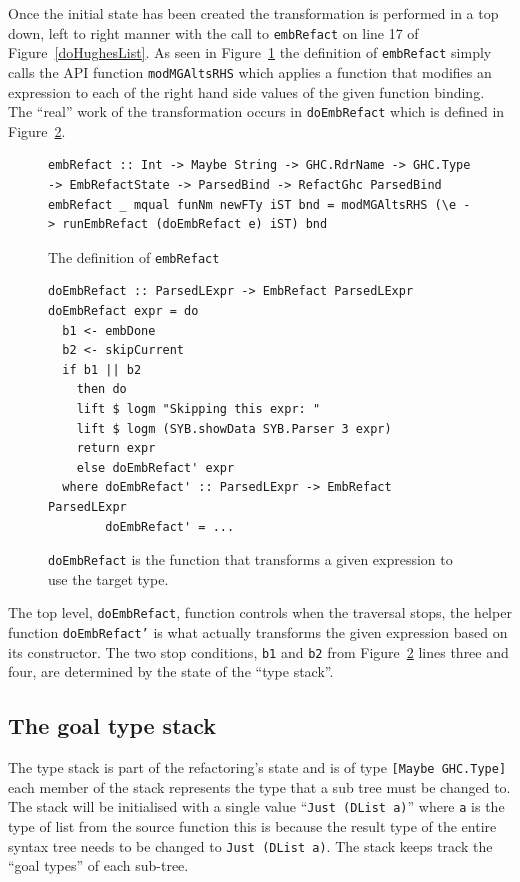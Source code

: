 Once the initial state has been created the transformation is performed in a top down, left to right manner with the call to \texttt{embRefact} on line 17 of Figure~\ref{doHughesList}. As seen in Figure~\ref{embRefact} the definition of \texttt{embRefact} simply calls the API function \texttt{modMGAltsRHS} which applies a function that modifies an expression to each of the right hand side values of the given function binding. The ``real'' work of the transformation occurs in \texttt{doEmbRefact} which is defined in Figure~\ref{doEmbRefact}.

\begin{figure}[t]
\begin{lstlisting}
embRefact :: Int -> Maybe String -> GHC.RdrName -> GHC.Type -> EmbRefactState -> ParsedBind -> RefactGhc ParsedBind
embRefact _ mqual funNm newFTy iST bnd = modMGAltsRHS (\e -> runEmbRefact (doEmbRefact e) iST) bnd
\end{lstlisting}
\caption{The definition of \texttt{embRefact}}
\label{embRefact}
\end{figure}

\begin{figure}[t]
\begin{lstlisting}
doEmbRefact :: ParsedLExpr -> EmbRefact ParsedLExpr
doEmbRefact expr = do
  b1 <- embDone
  b2 <- skipCurrent
  if b1 || b2
    then do
    lift $ logm "Skipping this expr: "
    lift $ logm (SYB.showData SYB.Parser 3 expr)
    return expr
    else doEmbRefact' expr
  where doEmbRefact' :: ParsedLExpr -> EmbRefact ParsedLExpr
  		doEmbRefact' = ...
\end{lstlisting}
\caption{\texttt{doEmbRefact} is the function that transforms a given expression to use the target type.}
\label{doEmbRefact}
\end{figure}

The top level, \texttt{doEmbRefact}, function controls when the traversal stops, the helper function \texttt{doEmbRefact'} is what actually transforms the given expression based on its constructor. The two stop conditions, \texttt{b1} and \texttt{b2} from Figure~\ref{doEmbRefact} lines three and four, are determined by the state of the ``type stack''.

\subsection{The goal type stack}
\label{typeStack}

The type stack is part of the refactoring's state and is of type \texttt{[Maybe GHC.Type]} each member of the stack represents the type that a sub tree must be changed to. The stack will be initialised with a single value ``\texttt{Just (DList a)}'' where \texttt{a} is the type of list from the source function this is because the result type of the entire syntax tree needs to be changed to \texttt{Just (DList a)}. The stack keeps track the ``goal types'' of each sub-tree. 

